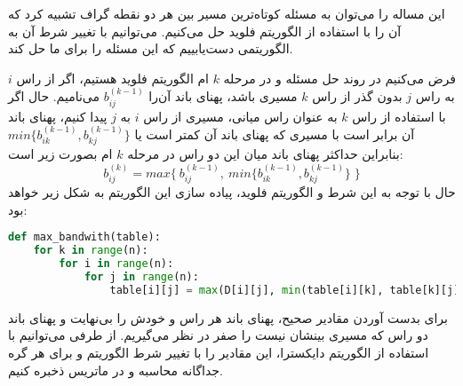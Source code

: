 \documentclass[]{article}
\begin{document}
این مساله را می‌توان به مسئله کوتاه‌ترین مسیر بین هر دو نقطه گراف تشبیه کرد که آن را
با استفاده از الگوریتم فلوید حل می‌کنیم. می‌توانیم با تغییر شرط آن
به الگوریتمی دست‌یابییم که این مسئله را برای ما حل کند.

فرض می‌کنیم در روند حل مسئله و در مرحله $k$ ام الگوریتم فلوید هستیم،
اگر از راس $i$ به راس $j$ بدون گذر از راس $k$ مسیری باشد، پهنای باند آن‌را $b^{(k-1)}_{ij}$ می‌نامیم.
حال اگر با استفاده از راس $k$ به عنوان راس میانی، مسیری از راس $i$ به $j$ پیدا کنیم،
پهنای باند آن برابر است با مسیری که پهنای باند آن کمتر است یا $min\lbrace b^{(k-1)}_{ik}, b^{(k-1)}_{kj} \rbrace$
بنابراین حداکثر پهنای باند میان این دو راس در مرحله $k$ ام بصورت زیر است:
$$b^{(k)}_{ij} = max \lbrace \: b^{(k-1)}_{ij},\: min\lbrace b^{(k-1)}_{ik}, b^{(k-1)}_{kj} \rbrace \; \rbrace$$
حال با توجه به این شرط و الگوریتم فلوید، پیاده سازی این الگوریتم به شکل زیر خواهد بود:
\begin{latin}
\begin{lstlisting}[language=python]
def max_bandwith(table):
    for k in range(n):
        for i in range(n):
            for j in range(n):
                table[i][j] = max(D[i][j], min(table[i][k], table[k][j]))
\end{lstlisting}
\end{latin}
برای بدست آوردن مقادیر صحیح، پهنای باند هر راس و خودش را بی‌نهایت و
پهنای باند دو راس که مسیری بینشان نیست را صفر در نظر می‌گیریم.
از طرفی می‌توانیم با استفاده از الگوریتم دایکسترا، این مقادیر را با تغییر شرط الگوریتم و
برای هر گره جداگانه محاسبه و در ماتریس ذخبره کنیم.
\end{document}
